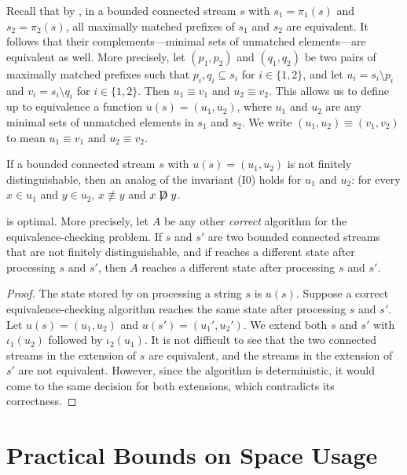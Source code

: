 Recall that by , in a bounded connected stream $s$ with $s_1=\pi_1(s)$ and $s_2=\pi_2(s)$, all maximally matched prefixes of $s_1$
and $s_2$ are equivalent. It follows that their complements---minimal sets
of unmatched elements---are equivalent as well. More precisely, let $(p_1,p_2)$
and $(q_1,q_2)$ be two pairs of maximally matched prefixes such that
$p_i,q_i\subseteq s_i$ for $i\in\{1,2\}$, and let $u_i=s_i\setminus p_i$
and $v_i=s_i\setminus q_i$ for $i\in\{1,2\}$. Then $u_1\equiv v_1$ and
$u_2\equiv v_2$. This allows us to define up to equivalence a function
$u(s)=(u_1,u_2)$, where $u_1$ and $u_2$ are any minimal sets of unmatched elements in $s_1$ and $s_2$. We write $(u_1,u_2)\equiv (v_1,v_2)$ to mean
$u_1\equiv v_1$ and
$u_2\equiv v_2$.

If a bounded connected stream $s$ with $u(s)=(u_1,u_2)$ is not finitely
distinguishable, then an analog of the invariant (I0) holds for $u_1$ and $u_2$:
for every $x\in u_1$ and $y\in u_2$, $x\not\equiv y$ and $x\not\mathrel{\mathrm{D}} y$.

\begin{theorem}\label{diffstream:thm:optimality}
   is optimal. More precisely,
  let $A$ be any other \emph{correct} algorithm for the equivalence-checking problem.
  If $s$ and $s'$ are two bounded connected streams that are not finitely distinguishable,
  and if  reaches a different state after processing $s$ and $s'$, then $A$ reaches a different state after processing $s$ and $s'$.
\end{theorem}

\begin{proof}
  The state stored by  on processing a string $s$ is $u(s)$.
  Suppose a correct equivalence-checking algorithm reaches the same state
  after processing $s$ and $s'$. Let $u(s)=(u_1,u_2)$ and $u(s')=(u_1',u_2')$.
  We extend both $s$ and $s'$ with $\iota_1(u_2)$ followed by $\iota_2(u_1)$.
  It is not difficult to see that the
  two connected streams in the extension of $s$
  are equivalent, and the streams in the extension of $s'$ are not equivalent.
  However, since the algorithm is deterministic, it would come to the same
  decision for both extensions, which contradicts its correctness.
\end{proof}

\section{Practical Bounds on Space Usage}
\label{diffstream:sec:practical-bounds}

